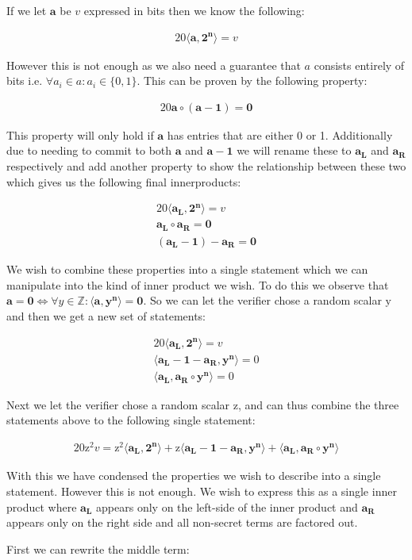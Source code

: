\documentclass{article}
\newcommand{\eq}[1]{\begin{alignat*}{20}#1\end{alignat*}}
\renewcommand{\vec}[1]{\boldsymbol{#1}}
\newcommand{\ran}[1]{\mathrm{#1}}
\newcommand{\vecran}[1]{\mathbf{#1}}
\newcommand{\dotp}[2]{\langle #1, #2 \rangle}
\begin{document}
If we let $\vec{a}$ be $v$ expressed in bits then we know the following:

\eq{\dotp{\vec{a}}{\vec{2^n}} = v}

However this is not enough as we also need a guarantee that $a$ consists entirely of bits i.e. $\forall a_i\in a: a_i\in \{0,1\}$. This can be proven by the following property: 

\eq{\vec{a}\circ (\vec{a} - \vec{1}) = \vec{0}}

This property will only hold if $\vec{a}$ has entries that are either 0 or 1. Additionally due to needing to commit to both $\vec{a}$ and $\vec{a} - \vec{1}$ we will rename these to $\vec{a_L}$ and $\vec{a_R}$ respectively and add another property to show the relationship between these two which gives us the following final innerproducts:

\eq{
	\dotp{\vec{a_L}}{\vec{2^n}} = v \\
	\vec{a_L}\circ \vec{a_R} = \vec{0} \\
	(\vec{a_L} - \vec{1}) - \vec{a_R} = \vec{0}
}

We wish to combine these properties into a single statement which we can manipulate into the kind of inner product we wish. To do this we observe that $\vec{a} = \vec{0} \iff \forall y\in\mathbb{Z}: \dotp{\vec{a}}{\vec{y^n}} = \vec{0}$. So we can let the verifier chose a random scalar $\ran{y}$ and then we get a new set of statements:

\eq{
	\dotp{\vec{a_L}}{\vec{2^n}} = v \\
	\dotp{\vec{a_L} - \vec{1} - \vec{a_R}}{\vecran{y^n}} = 0 \\
	\dotp{\vec{a_L}}{\vec{a_R}\circ \vecran{y^n}} = 0
}

Next we let the verifier chose a random scalar $\ran{z}$, and can thus combine the three statements above to the following single statement: 

\eq{
	\ran{z^2}v = 
	\ran{z^2}\dotp{\vec{a_L}}{\vec{2^n}} +
	\ran{z}\dotp{\vec{a_L} - \vec{1} - \vec{a_R}}{\vecran{y^n}} +
	\dotp{\vec{a_L}}{\vec{a_R}\circ \vecran{y^n}}
}

With this we have condensed the properties we wish to describe into a single statement. However this is not enough. We wish to express this as a single inner product where $\vec{a_L}$ appears only on the left-side of the inner product and $\vec{a_R}$ appears only on the right side and all non-secret terms are factored out. 

First we can rewrite the middle term:
\end{document}
